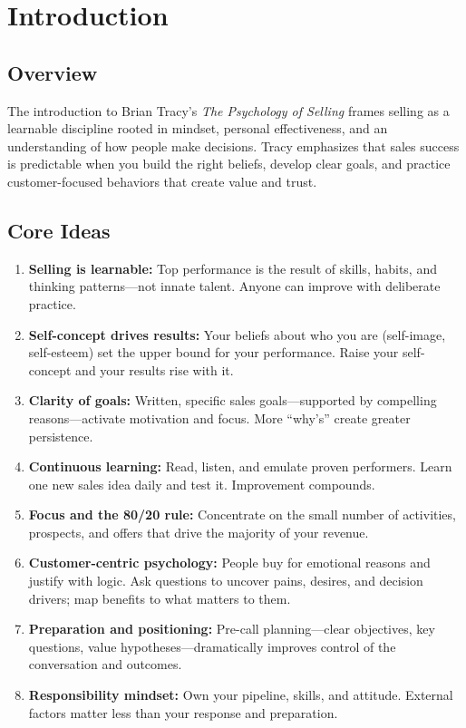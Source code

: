 \section{Introduction}

\subsection*{Overview}
The introduction to Brian Tracy’s \emph{The Psychology of Selling} frames selling as a learnable discipline rooted in mindset, personal effectiveness, and an understanding of how people make decisions. Tracy emphasizes that sales success is predictable when you build the right beliefs, develop clear goals, and practice customer-focused behaviors that create value and trust.

\subsection*{Core Ideas}
\begin{enumerate}
    \item \textbf{Selling is learnable:} Top performance is the result of skills, habits, and thinking patterns—not innate talent. Anyone can improve with deliberate practice.
    \item \textbf{Self-concept drives results:} Your beliefs about who you are (self-image, self-esteem) set the upper bound for your performance. Raise your self-concept and your results rise with it.
    \item \textbf{Clarity of goals:} Written, specific sales goals—supported by compelling reasons—activate motivation and focus. More “why’s” create greater persistence.
    \item \textbf{Continuous learning:} Read, listen, and emulate proven performers. Learn one new sales idea daily and test it. Improvement compounds.
    \item \textbf{Focus and the 80/20 rule:} Concentrate on the small number of activities, prospects, and offers that drive the majority of your revenue.
    \item \textbf{Customer-centric psychology:} People buy for emotional reasons and justify with logic. Ask questions to uncover pains, desires, and decision drivers; map benefits to what matters to them.
    \item \textbf{Preparation and positioning:} Pre-call planning—clear objectives, key questions, value hypotheses—dramatically improves control of the conversation and outcomes.
    \item \textbf{Responsibility mindset:} Own your pipeline, skills, and attitude. External factors matter less than your response and preparation.
\end{enumerate}

